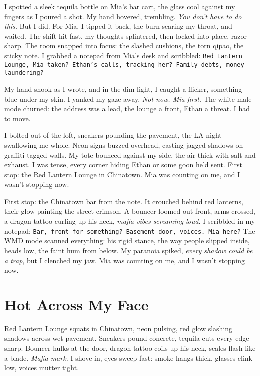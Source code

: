 \documentclass[12pt]{article}
\newcommand{\note}[1]{\texttt{#1}}
\begin{document}
{I spotted a sleek tequila bottle on \textnormal{Mia}’s bar cart, the glass cool against my fingers as I poured a shot. My hand hovered, trembling. \textit{You don’t have to do this.} But I did. For \textnormal{Mia}. I tipped it back, the burn searing my throat, and waited. The shift hit fast, my thoughts splintered, then locked into place, razor-sharp. The room snapped into focus: the slashed cushions, the torn qipao, the sticky note. I grabbed a notepad from \textnormal{Mia}’s desk and scribbled: \note{Red Lantern Lounge, Mia taken? Ethan’s calls, tracking her? Family debts, money laundering?}

My hand shook as I wrote, and in the dim light, I caught a flicker, something blue under my skin. I yanked my gaze away. \textit{Not now. Mia first.} The white male mode churned: the address was a lead, the lounge a front, \textnormal{Ethan} a threat. I had to move.

I bolted out of the loft, sneakers pounding the pavement, the LA night swallowing me whole. Neon signs buzzed overhead, casting jagged shadows on graffiti-tagged walls. My tote bounced against my side, the air thick with salt and exhaust. I was tense, every corner hiding \textnormal{Ethan} or some goon he’d sent. First stop: the Red Lantern Lounge in Chinatown. \textnormal{Mia} was counting on me, and I wasn’t stopping now.

First stop: the Chinatown bar from the note. It crouched behind red lanterns, their glow painting the street crimson. A bouncer loomed out front, arms crossed, a dragon tattoo curling up his neck, \textit{mafia vibes screaming loud.} I scribbled in my notepad: \note{Bar, front for something? Basement door, voices. Mia here?} The WMD mode scanned everything: his rigid stance, the way people slipped inside, heads low, the faint hum from below. My paranoia spiked, \textit{every shadow could be a trap}, but I clenched my jaw. \textnormal{Mia} was counting on me, and I wasn’t stopping now.

\section{Hot Across My Face}

Red Lantern Lounge squats in Chinatown, neon pulsing, red glow slashing shadows across wet pavement. Sneakers pound concrete, tequila cuts every edge sharp. Bouncer hulks at the door, dragon tattoo coils up his neck, scales flash like a blade. \textit{Mafia mark.} I shove in, eyes sweep fast: smoke hangs thick, glasses clink low, voices mutter tight.

}
\end{document}

